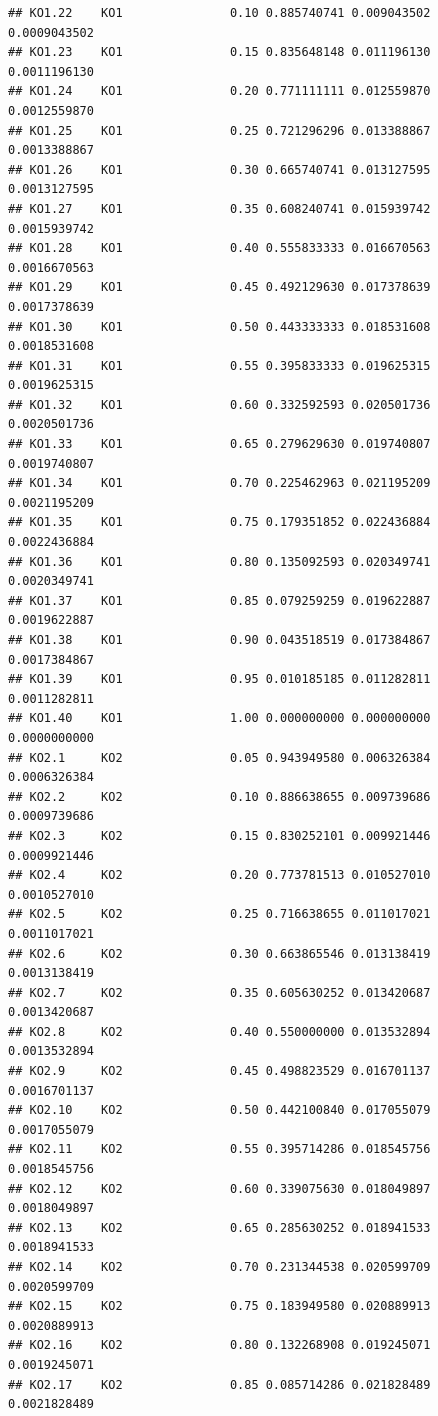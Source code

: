 \documentclass[
]{book}
\begin{document}
\begin{verbatim}
## KO1.22    KO1               0.10 0.885740741 0.009043502 0.0009043502
## KO1.23    KO1               0.15 0.835648148 0.011196130 0.0011196130
## KO1.24    KO1               0.20 0.771111111 0.012559870 0.0012559870
## KO1.25    KO1               0.25 0.721296296 0.013388867 0.0013388867
## KO1.26    KO1               0.30 0.665740741 0.013127595 0.0013127595
## KO1.27    KO1               0.35 0.608240741 0.015939742 0.0015939742
## KO1.28    KO1               0.40 0.555833333 0.016670563 0.0016670563
## KO1.29    KO1               0.45 0.492129630 0.017378639 0.0017378639
## KO1.30    KO1               0.50 0.443333333 0.018531608 0.0018531608
## KO1.31    KO1               0.55 0.395833333 0.019625315 0.0019625315
## KO1.32    KO1               0.60 0.332592593 0.020501736 0.0020501736
## KO1.33    KO1               0.65 0.279629630 0.019740807 0.0019740807
## KO1.34    KO1               0.70 0.225462963 0.021195209 0.0021195209
## KO1.35    KO1               0.75 0.179351852 0.022436884 0.0022436884
## KO1.36    KO1               0.80 0.135092593 0.020349741 0.0020349741
## KO1.37    KO1               0.85 0.079259259 0.019622887 0.0019622887
## KO1.38    KO1               0.90 0.043518519 0.017384867 0.0017384867
## KO1.39    KO1               0.95 0.010185185 0.011282811 0.0011282811
## KO1.40    KO1               1.00 0.000000000 0.000000000 0.0000000000
## KO2.1     KO2               0.05 0.943949580 0.006326384 0.0006326384
## KO2.2     KO2               0.10 0.886638655 0.009739686 0.0009739686
## KO2.3     KO2               0.15 0.830252101 0.009921446 0.0009921446
## KO2.4     KO2               0.20 0.773781513 0.010527010 0.0010527010
## KO2.5     KO2               0.25 0.716638655 0.011017021 0.0011017021
## KO2.6     KO2               0.30 0.663865546 0.013138419 0.0013138419
## KO2.7     KO2               0.35 0.605630252 0.013420687 0.0013420687
## KO2.8     KO2               0.40 0.550000000 0.013532894 0.0013532894
## KO2.9     KO2               0.45 0.498823529 0.016701137 0.0016701137
## KO2.10    KO2               0.50 0.442100840 0.017055079 0.0017055079
## KO2.11    KO2               0.55 0.395714286 0.018545756 0.0018545756
## KO2.12    KO2               0.60 0.339075630 0.018049897 0.0018049897
## KO2.13    KO2               0.65 0.285630252 0.018941533 0.0018941533
## KO2.14    KO2               0.70 0.231344538 0.020599709 0.0020599709
## KO2.15    KO2               0.75 0.183949580 0.020889913 0.0020889913
## KO2.16    KO2               0.80 0.132268908 0.019245071 0.0019245071
## KO2.17    KO2               0.85 0.085714286 0.021828489 0.0021828489

\end{verbatim}
\end{document}
